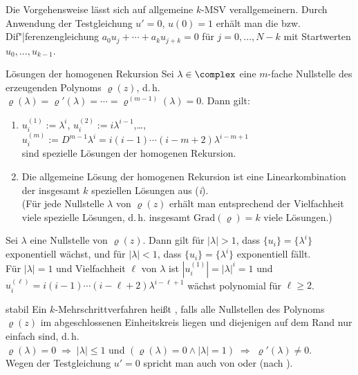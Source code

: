 \linie

\begin{Bem}
    Die Vorgehensweise lässt sich auf allgemeine $k$-MSV verallgemeinern.
    Durch Anwendung der Testgleichung $u' = 0$, $u(0) = 1$ erhält man die
     bzw. Dif"|ferenzengleichung
    $a_0 u_j + \dotsb + a_k u_{j+k} = 0$ für $j = 0, \dotsc, N - k$
    mit Startwerten $u_0, \dotsc, u_{k-1}$.
\end{Bem}

\begin{Satz}{Lösungen der homogenen Rekursion}
    Sei $\lambda \in \complex$ eine $m$-fache Nullstelle des erzeugenden
    Polynoms $\varrho(z)$, d.\,h.
    $\varrho(\lambda) = \varrho'(\lambda) = \dotsb =
    \varrho^{(m-1)}(\lambda) = 0$.
    Dann gilt:
    \begin{enumerate}[label=(\emph{\roman*})]
        \item
        $u_i^{(1)} := \lambda^i$,\qquad
        $u_i^{(2)} := i \lambda^{i-1}$,\qquad \dots,\qquad
        $u_i^{(m)} := D^{m-1} \lambda^i =
        i (i - 1) \dotsm (i - m + 2) \lambda^{i-m+1}$\\
        sind spezielle Lösungen der homogenen Rekursion.

        \item
        Die allgemeine Lösung der homogenen Rekursion ist eine
        Linearkombination der insgesamt $k$ speziellen Lösungen aus
        (\emph{i}).\\
        (Für jede Nullstelle $\lambda$ von $\varrho(z)$ erhält man entsprechend
        der Vielfachheit viele spezielle Lösungen, d.\,h. insgesamt
        $\text{Grad}(\varrho) = k$ viele Lösungen.)
    \end{enumerate}
\end{Satz}

\begin{Bem}
    Sei $\lambda$ eine Nullstelle von $\varrho(z)$.
    Dann gilt für $|\lambda| > 1$, dass $\{u_i\} = \{\lambda^i\}$ exponentiell
    wächst, und für $|\lambda| < 1$, dass $\{u_i\} = \{\lambda^i\}$
    exponentiell fällt.\\
    Für $|\lambda| = 1$ und Vielfachheit $\ell$ von $\lambda$ ist
    $|u_i^{(1)}| = |\lambda|^i = 1$ und
    $u_i^{(\ell)} = i (i - 1) \dotsm (i - \ell + 2) \lambda^{i - \ell + 1}$
    wächst polynomial für $\ell \ge 2$.
\end{Bem}

\linie
\pagebreak

\begin{Def}{stabil}
    Ein $k$-Mehrschrittverfahren heißt , falls alle Nullstellen
    des Polynoms $\varrho(z)$ im abgeschlossenen Einheitskreis liegen und
    diejenigen auf dem Rand nur einfach sind, d.\,h.\\
    $\varrho(\lambda) = 0 \;\Rightarrow\; |\lambda| \le 1$ und
    $(\varrho(\lambda) = 0 \land |\lambda| = 1) \;\Rightarrow\;
    \varrho'(\lambda) \not= 0$.\\
    Wegen der Testgleichung $u' = 0$ spricht man auch von
     oder 
    (nach ).
\end{Def}

